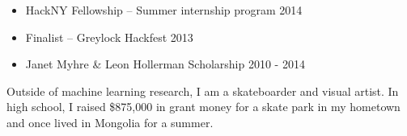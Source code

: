 \documentclass[11pt]{article}
\renewcommand{\section}[1]
{\vspace{1.0\baselineskip}{\Large\textbf{#1}}}
\newcommand{\makecolophon}
{\centering\ding{118} Last modified on \today~\ding{118}}
\begin{document}
\begin{itemize}[leftmargin=12pt]
  \item[] HackNY Fellowship -- Summer internship program
  \hfill 2014
  \item[] Finalist -- Greylock Hackfest 
  \hfill 2013
  \item[] Janet Myhre \& Leon Hollerman Scholarship
  \hfill 2010 - 2014
\end{itemize}




\section{Other}

Outside of machine learning research, I am a skateboarder and visual artist. In high school, I raised \$875,000 in grant money for a skate park in my hometown and once lived in Mongolia for a summer.





\end{document}
